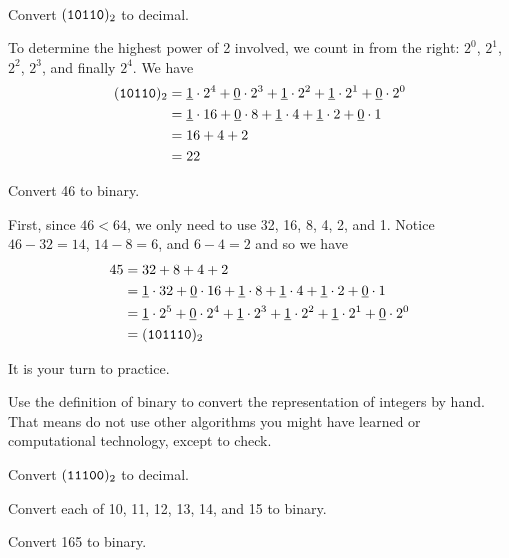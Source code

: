 \begin{exam}
\label{exam_binary_decimal}
~
    \begin{apart}
        \item Convert $(\texttt{10110})_2$ to decimal.
            \begin{soln}
               To determine the highest power of 2 involved, we count in from the right:  $2^0$, $2^1$, $2^2$, $2^3$, and finally $2^4$.  We have
                \begin{align*}
                    (\texttt{10110})_2 & =  \underline{1} \cdot 2^4 +  \underline{0} \cdot 2^3 +  \underline{1} \cdot 2^2 +  \underline{1} \cdot 2^1 +  \underline{0} \cdot 2^0 \\
                    & = \underline{1} \cdot 16 +  \underline{0} \cdot 8 +  \underline{1} \cdot 4 +  \underline{1} \cdot 2 +  \underline{0} \cdot 1 \\
                    & =16 + 4 + 2 \\
                    & = 22
                \end{align*}
            \end{soln}
        \item Convert 46 to binary.
            \begin{soln}
                First, since $46<64$, we only need to use 32, 16, 8, 4, 2, and 1. Notice $46-32 = 14$, $14-8 = 6$, and $6-4=2$ and so we have
                    \begin{align*}
                    45 & = 32+8+4+2 \\
                    & =\underline{1}\cdot 32 + \underline{0}\cdot 16 +
                    \underline{1}\cdot 8 + \underline{1}\cdot 4 +\underline{1}\cdot 2
                    + \underline{0}\cdot 1  \\
                    & =\underline{1}\cdot 2^5 + \underline{0}\cdot 2^4 +
                    \underline{1}\cdot 2^3 + \underline{1}\cdot 2^2 +\underline{1}\cdot 2^1
                    + \underline{0}\cdot 2^0 \\
                    & = (\texttt{101110})_2
                    \end{align*}
            \end{soln}
    \end{apart}
\end{exam}

It is your turn to practice.  

\begin{act}
\label{act_bin_decimal}
    Use the definition of binary to convert the representation of integers by hand. That means do not use other algorithms you might have learned or computational technology, except to check.
        \begin{actpart}
            \item Convert $(\texttt{11100})_2$ to decimal.          
            \item Convert each of 10, 11, 12, 13, 14, and 15 to binary.
            \item \label{part_165binary} Convert 165 to binary.
        \end{actpart}
\end{act}

